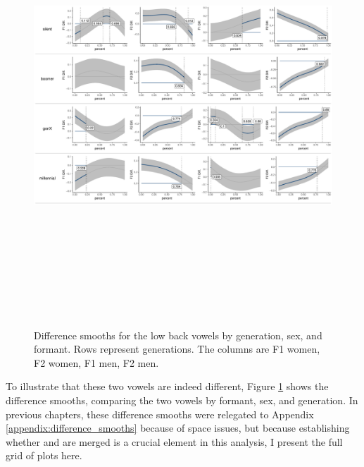 \begin{figure}[p]
    \centering
    \includegraphics[angle=90, origin=c, height = 6.5in]{Figures/other_figures/low_back_diff_smooths.pdf}
    \caption[Difference smooths for the low back vowels]{Difference smooths for the low back vowels by generation, sex, and formant. Rows represent generations. The columns are F1 women, F2 women, F1 men, F2 men.}
    \label{fig:low_back_difference_smooths}
\end{figure}

To illustrate that these two vowels are indeed different, Figure \ref{fig:low_back_difference_smooths} shows the difference smooths, comparing the two vowels by formant, sex, and generation. In previous chapters, these difference smooths were relegated to Appendix \ref{appendix:difference_smooths} because of space issues, but because establishing whether \lot and \thought are merged is a crucial element in this analysis, I present the full grid of plots here.

